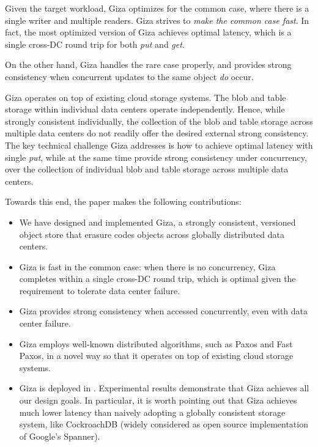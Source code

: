 Given the target workload, Giza optimizes for the common case, where there is
a single writer and multiple readers. Giza strives to {\em make the common case
fast}. In fact, the most optimized version of Giza achieves optimal latency,
which is a single cross-DC round trip for both {\em put} and {\em get}.

On the other hand, Giza handles the rare case properly,
and provides strong consistency when concurrent updates to the same object {\em do} occur.

Giza operates on top of existing cloud storage systems. 
The blob and table storage within individual data centers operate independently.
Hence, while strongly consistent individually, the collection of the blob and
table storage across multiple data centers do not readily offer the desired
external strong consistency. The key technical challenge Giza addresses is how to achieve
optimal latency with single {\em put}, while at the same time provide
strong consistency under concurrency, over the collection of individual blob and
table storage across multiple data centers.

Towards this end, the paper makes the following contributions:
\begin{itemize}
    \item We have designed and implemented Giza, a strongly consistent,
      versioned object store that erasure codes objects across globally
      distributed data centers.
    \item Giza is fast in the common case: when there is no concurrency, Giza
      completes within a single cross-DC round trip, which is optimal given the
      requirement to tolerate data center failure.
    \item Giza provides strong consistency when accessed concurrently, even with data center
      failure.
    \item Giza employs well-known distributed algorithms, such as Paxos and Fast
      Paxos, in a novel way so that it operates on top of existing cloud storage
      systems.
    \item Giza is deployed in \deployment. Experimental results demonstrate
      that Giza achieves all our design goals. In particular, it is worth
      pointing out that Giza achieves much lower latency than naively adopting a
      globally consistent storage system, like CockroachDB (widely considered as open source
      implementation of Google's Spanner).
\end{itemize}
